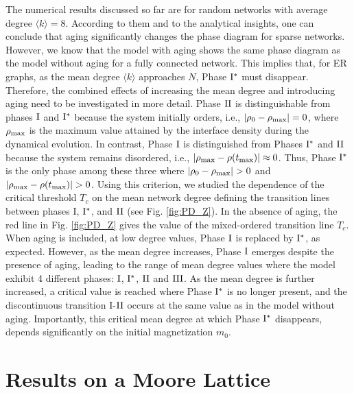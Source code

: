 The numerical results discussed so far are for random networks with average degree $\langle k \rangle = 8$. According to them and to the analytical insights, one can conclude that aging significantly changes the phase diagram for sparse networks. However, we know that the model with aging shows the same phase diagram as the model without aging for a fully connected network. This implies that, for ER graphs, as the mean degree $\langle k \rangle$ approaches $N$, Phase ${\rm I}^{*}$ must disappear. Therefore, the combined effects of increasing the mean degree and introducing aging need to be investigated in more detail. Phase ${\rm II}$ is distinguishable from phases ${\rm I}$ and ${\rm I}^{*}$ because the system initially orders, i.e., $|\rho_0 - \rho_{\rm max}| = 0$, where $\rho_{\rm max}$ is the maximum value attained by the interface density during the dynamical evolution. In contrast, Phase ${\rm I}$ is distinguished from Phases ${\rm I}^{*}$ and ${\rm II}$ because the system remains disordered, i.e., $|\rho_{\rm max} - \rho(t_{\rm max})| \approx 0$. Thus, Phase ${\rm I}^{*}$ is the only phase among these three where $|\rho_0 - \rho_{\rm max}| > 0$ and $|\rho_{\rm max} - \rho(t_{\rm max})| > 0$. Using this criterion, we studied the dependence of the critical threshold  $T_c$ on the mean network degree defining the transition lines between phases I, ${\rm I}^{*}$, and ${\rm II}$ (see Fig. \ref{fig:PD_Z}). In the absence of aging, the red line in Fig. \ref{fig:PD_Z} gives the value of the mixed-ordered transition line $T_c$. When aging is included, at low degree values, Phase ${\rm I}$ is replaced by ${\rm I}^{*}$, as expected. However, as the mean degree increases, Phase ${\rm I}$ emerges despite the presence of aging, leading to the range of mean degree values where the model exhibit 4 different phases: ${\rm I}$, ${\rm I}^{*}$, ${\rm II} $ and ${\rm III}$. As the mean degree is further increased, a critical value is reached where Phase ${\rm I}^{*}$ is no longer present, and the discontinuous transition I-${\rm II}$ occurs at the same value as in the model without aging. Importantly, this critical mean degree at which Phase ${\rm I}^{*}$ disappears, depends significantly on the initial magnetization $m_0$.

\section{\label{sec: Results on a Moore Lattice}  Results on a Moore Lattice}

